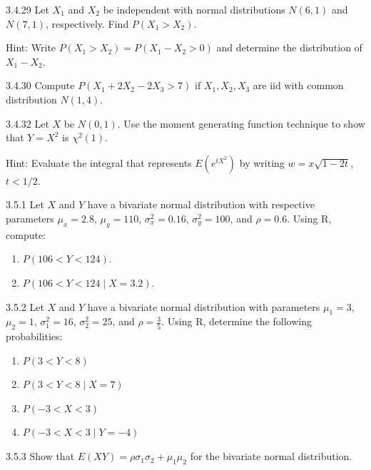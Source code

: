 \begin{exercise}{3.4.29}
Let $X_1$ and $X_2$ be independent with normal distributions $N(6, 1)$ and $N(7, 1)$, respectively. Find $P(X_1 > X_2)$.

Hint: Write $P(X_1 > X_2) = P(X_1 - X_2 > 0)$ and determine the distribution of $X_1 - X_2$.
\end{exercise}

\begin{exercise}{3.4.30}
Compute $P(X_1 + 2X_2 - 2X_3 > 7)$ if $X_1, X_2, X_3$ are iid with common distribution $N(1, 4)$.
\end{exercise}

\begin{exercise}{3.4.32}
Let $X$ be $N(0, 1)$. Use the moment generating function technique to show that $Y = X^2$ is $\chi^2(1)$.

Hint: Evaluate the integral that represents $E(e^{tX^2})$ by writing $w = x\sqrt{1-2t}$, $t < 1/2$.
\end{exercise}

\begin{exercise}{3.5.1}
Let $X$ and $Y$ have a bivariate normal distribution with respective parameters $\mu_x = 2.8$, $\mu_y = 110$, $\sigma_x^2 = 0.16$, $\sigma_y^2 = 100$, and $\rho = 0.6$. Using R, compute:
\begin{enumerate}
\item $P(106 < Y < 124)$.
\item $P(106 < Y < 124 \mid X = 3.2)$.
\end{enumerate}
\end{exercise}

\begin{exercise}{3.5.2}
Let $X$ and $Y$ have a bivariate normal distribution with parameters $\mu_1 = 3$, $\mu_2 = 1$, $\sigma_1^2 = 16$, $\sigma_2^2 = 25$, and $\rho = \frac{3}{5}$. Using R, determine the following probabilities:
\begin{enumerate}
\item $P(3 < Y < 8)$
\item $P(3 < Y < 8 \mid X = 7)$
\item $P(-3 < X < 3)$
\item $P(-3 < X < 3 \mid Y = -4)$
\end{enumerate}
\end{exercise}

\begin{exercise}{3.5.3}
Show that $E(XY) = \rho\sigma_1\sigma_2 + \mu_1\mu_2$ for the bivariate normal distribution.
\end{exercise}

